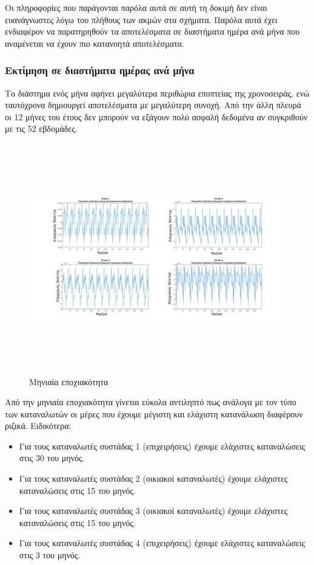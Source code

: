 Οι πληροφορίες που παράγονται παρόλα αυτά σε αυτή τη δοκιμή δεν είναι ευανάγνωστες λόγω του πλήθους των ακμών στα σχήματα. Παρόλα αυτά έχει ενδιαφέρον να παρατηρηθούν τα αποτελέσματα σε διαστήματα ημέρα ανά μήνα που αναμένεται να έχουν πιο κατανοητά αποτελέσματα.
\subsubsection{Εκτίμηση σε διαστήματα ημέρας ανά μήνα}
Το διάστημα ενός μήνα αφήνει μεγαλύτερα περιθώρια εποπτείας της χρονοσειράς, ενώ ταυτόχρονα δημιουργεί αποτελέσματα με μεγαλύτερη συνοχή. Από την άλλη πλευρά οι 12 μήνες του έτους δεν μπορούν να εξάγουν πολύ ασφαλή δεδομένα αν συγκριθούν με τις 52 εβδομάδες.

\begin{figure}[ht!]
\centering
\includegraphics[width=180mm, height=100mm]{../../plots/Trend_estimation/seasonal_month_ALL.png}
\caption{Μηνιαία εποχιακότητα}
\label{fig:season daypermonth}
\end{figure}

Από την μηνιαία εποχιακότητα γίνεται εύκολα αντιληπτό πως ανάλογα με τον τύπο των καταναλωτών οι μέρες που έχουμε μέγιστη και ελάχιστη κατανάλωση διαφέρουν ριζικά. Ειδικότερα:
\begin{itemize}
\item Για τους καταναλωτές συστάδας 1 (επιχειρήσεις) έχουμε ελάχιστες καταναλώσεις στις 30 του μηνός.
\item Για τους καταναλωτές συστάδας 2 (οικιακοί καταναλωτές) έχουμε ελάχιστες καταναλώσεις στις 15 του μηνός.
\item Για τους καταναλωτές συστάδας 3 (οικιακοί καταναλωτές) έχουμε ελάχιστες καταναλώσεις στις 15 του μηνός.
\item Για τους καταναλωτές συστάδας 4 (επιχειρήσεις) έχουμε ελάχιστες καταναλώσεις στις 3 του μηνός.
\end{itemize}
\newpage
